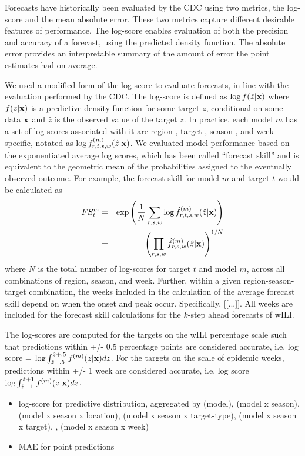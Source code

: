 \documentclass{article}\usepackage[]{graphicx}\usepackage[]{color}
\begin{document}
Forecasts have historically been evaluated by the CDC using two metrics, the log-score and the mean absolute error. These two metrics capture different desirable features of performance. The log-score enables evaluation of both the precision and accuracy of a forecast, using the predicted density function.\cite{Gneiting2007} The absolute error provides an interpretable summary of the amount of error the point estimates had on average.\cite{Reich2016} 

We used a modified form of the log-score to evaluate forecasts, in line with the evaluation performed by the CDC. The log-score is defined as $\log f(\hat z|\bf{x})$ where $f(z|\bf{x})$ is a predictive density function for some target $z$, conditional on some data $\bf{x}$ and $\hat z$ is the observed value of the target $z$. In practice, each model $m$ has a set of log scores associated with it are region-, target-, season-, and week- specific, notated as $\log f^{(m)}_{r,t,s,w}(\hat z|\bf{x})$. We evaluated model performance based on the exponentiated average log scores, which has been called ``forecast skill'' and is equivalent to the geometric mean of the probabilities assigned to the eventually observed outcome. 
For example, the forecast skill for model $m$ and target $t$ would be calculated as
\begin{eqnarray}
 FS^{m}_{t} & = & \exp \left ( \frac{1}{N} \sum_{r,s,w} \log \hat f^{(m)}_{r,t,s,w}(\hat z|{\bf x}) \right ) \\
 & = & \left ( \prod_{r,s,w} \hat f^{(m)}_{r,s,w}(\hat z|{\bf x}) \right ) ^{1/N} 
\end{eqnarray}
where $N$ is the total number of log-scores for target $t$ and model $m$, across all combinations of region, season, and week. 
Further, within a given region-season-target combination, the weeks included in the calculation of the average forecast skill depend on when the onset and peak occur. Specifically, [[...]].
All weeks are included for the forecast skill calculations for the $k$-step ahead forecasts of wILI.

The log-scores are computed for the targets on the wILI percentage scale such that predictions within +/- 0.5 percentage points are considered accurate, i.e. log score = $\log \int_{\hat z -.5}^{\hat z + .5} f^{(m)}(z|{\bf{x}})dz$. For the targets on the scale of epidemic weeks, predictions within +/- 1 week are considered accurate, i.e. log score = $\log \int_{\hat z -1}^{\hat z + 1} f^{(m)}(z|{\bf{x}})dz$. 
\begin{itemize}
    \item log-score for predictive distribution, aggregated by (model), (model x season), (model x season x location), (model x season x target-type), (model x season x target), , (model x season x week)
    \item MAE for point predictions
\end{itemize}
\end{document}
